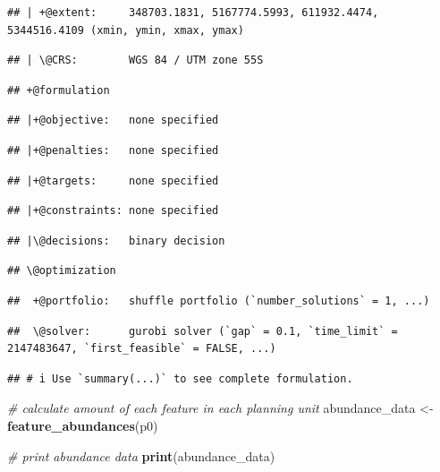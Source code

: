 \documentclass[12pt,]{book}
\newenvironment{Shaded}{\begin{snugshade}}{\end{snugshade}}
\newcommand{\CommentTok}[1]{\textcolor[rgb]{0.56,0.35,0.01}{\textit{#1}}}
\newcommand{\KeywordTok}[1]{\textcolor[rgb]{0.13,0.29,0.53}{\textbf{#1}}}
\newcommand{\NormalTok}[1]{#1}
\newcommand{\StringTok}[1]{\textcolor[rgb]{0.31,0.60,0.02}{#1}}
\begin{document}
\begin{verbatim}
## | +@extent:     348703.1831, 5167774.5993, 611932.4474, 5344516.4109 (xmin, ymin, xmax, ymax)
\end{verbatim}

\begin{verbatim}
## | \@CRS:        WGS 84 / UTM zone 55S
\end{verbatim}

\begin{verbatim}
## +@formulation
\end{verbatim}

\begin{verbatim}
## |+@objective:   none specified
\end{verbatim}

\begin{verbatim}
## |+@penalties:   none specified
\end{verbatim}

\begin{verbatim}
## |+@targets:     none specified
\end{verbatim}

\begin{verbatim}
## |+@constraints: none specified
\end{verbatim}

\begin{verbatim}
## |\@decisions:   binary decision
\end{verbatim}

\begin{verbatim}
## \@optimization
\end{verbatim}

\begin{verbatim}
##  +@portfolio:   shuffle portfolio (`number_solutions` = 1, ...)
\end{verbatim}

\begin{verbatim}
##  \@solver:      gurobi solver (`gap` = 0.1, `time_limit` = 2147483647, `first_feasible` = FALSE, ...)
\end{verbatim}

\begin{verbatim}
## # i Use `summary(...)` to see complete formulation.
\end{verbatim}

\begin{Shaded}
\begin{Highlighting}[]
\CommentTok{# calculate amount of each feature in each planning unit}
\NormalTok{abundance_data <-}\StringTok{ }\KeywordTok{feature_abundances}\NormalTok{(p0)}

\CommentTok{# print abundance data}
\KeywordTok{print}\NormalTok{(abundance_data)}
\end{Highlighting}
\end{Shaded}
\end{document}
